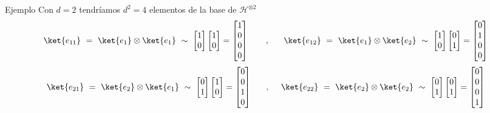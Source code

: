 \documentclass[a4paper,11pt]{book} %
\numberwithin{equation}{chapter}
\begin{document}
	\begin{mybox_green}{Ejemplo}
	Con $d=2$ tendríamos $d^2 = 4$ elementos de la base de $\mathcal{H}^{\otimes 2}$
\begin{equation}
\ket{e_{11}}~=~ \ket{e_{1}}\otimes \ket{e_{1}}~ \sim~
\begin{bmatrix}1\\ 0\end{bmatrix}\begin{bmatrix}1\\ 0\end{bmatrix} = \begin{bmatrix}1\\0\\0 \\ 0\end{bmatrix}
~~~~~~,~~~~~
\ket{e_{12}}~=~ \ket{e_{1}}\otimes \ket{e_{2}}~\sim~
\begin{bmatrix}1\\ 0\end{bmatrix}\begin{bmatrix}0\\ 1\end{bmatrix} = \begin{bmatrix}0\\1\\0 \\ 0\end{bmatrix}
\end{equation}
\begin{equation}
\ket{e_{21}}~=~ \ket{e_{2}}\otimes \ket{e_{1}}~\sim~
 \begin{bmatrix}0\\ 1\end{bmatrix}\begin{bmatrix}1\\ 0\end{bmatrix} = \begin{bmatrix}0\\0\\1 \\ 0\end{bmatrix}
 ~~~~~,~~~~
\ket{e_{22}}~=~ \ket{e_{2}}\otimes \ket{e_{2}}~\sim~
\begin{bmatrix}0\\ 1\end{bmatrix}\begin{bmatrix}0\\ 1\end{bmatrix} = \begin{bmatrix}0\\0\\0 \\ 1\end{bmatrix}

\end{equation}
\end{mybox_green}
\end{document}
